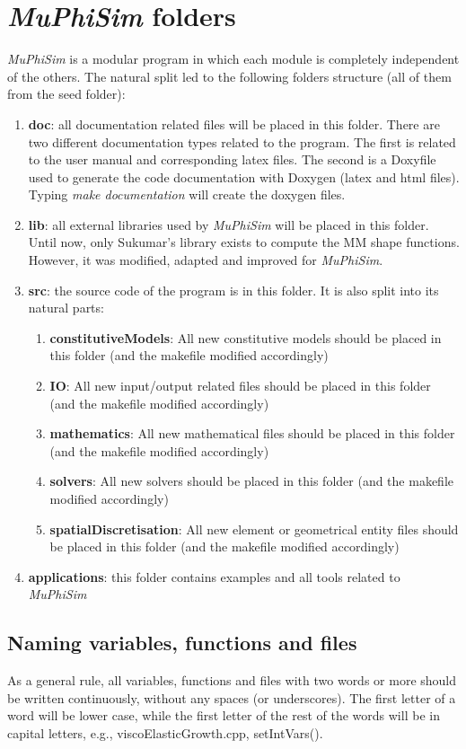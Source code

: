 \documentclass[oneside,11pt,times]{book}
\begin{document}
\section{\textit{MuPhiSim} folders}
\textit{MuPhiSim} is a modular program in which each module is completely independent of the others. The natural split led to the following folders structure (all of them from the seed folder):
\begin{enumerate}
\item \textbf{doc}: all documentation related files will be placed in this folder. There are two different documentation types related to the program. The first is related to the user manual and corresponding latex files. The second is a Doxyfile used to generate the code documentation with Doxygen (latex and html files). Typing \textit{make documentation} will create the doxygen files.
\item \textbf{lib}: all external libraries used by \textit{MuPhiSim} will be placed in this folder. Until now, only Sukumar's library exists to compute the MM shape functions. However, it was modified, adapted and improved for \textit{MuPhiSim}.
\item \textbf{src}: the source code of the program is in this folder. It is also split into its natural parts:
\begin{enumerate}
	\item \textbf{constitutiveModels}: All new constitutive models should be placed in this folder (and the makefile modified accordingly)
	\item \textbf{IO}: All new input/output related files should be placed in this folder (and the makefile modified accordingly)
	\item \textbf{mathematics}: All new mathematical files should be placed in this folder (and the makefile modified accordingly)
	\item \textbf{solvers}: All new solvers should be placed in this folder (and the makefile modified accordingly)
	\item \textbf{spatialDiscretisation}: All new element or geometrical entity files should be placed in this folder (and the makefile modified accordingly)
\end{enumerate}
\item \textbf{applications}: this folder contains examples and all tools related to \textit{MuPhiSim} 
\end{enumerate}

\subsection{Naming variables, functions and files}
As a general rule, all variables, functions and files with two words or more should be written continuously, without any spaces (or underscores). The first letter of a word will be lower case, while the first letter of the rest of the words will be in capital letters, e.g., viscoElasticGrowth.cpp, setIntVars().
\end{document}
